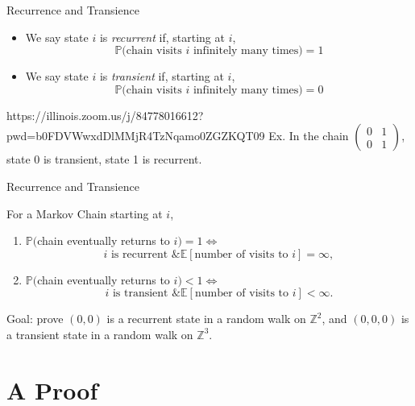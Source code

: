 \documentclass[aspectratio=169, handout]{beamer}
\newcommand{\pp}[0]{\mathbb{P}}
\newcommand{\ee}[0]{\mathbb{E}}
\begin{document}
\begin{frame}{Recurrence and Transience}
    \begin{itemize}
        \item We say state $i$ is \textit{recurrent} if, starting at $i$,
        \[\pp(\text{chain visits $i$ infinitely many times)} = 1\]
        \item We say state $i$ is \textit{transient} if, starting at $i$, 
        \[\pp(\text{chain visits $i$ infinitely many times)} = 0\]
    \end{itemize} \pause
    
https://illinois.zoom.us/j/84778016612?pwd=b0FDVWwxdDlMMjR4TzNqamo0ZGZKQT09    Ex. In the chain $\begin{pmatrix}
        0 & 1 \\
        0 & 1 
    \end{pmatrix}$, state 0 is transient, state 1 is recurrent.
\end{frame}

\begin{frame}{Recurrence and Transience}
    \begin{thrm}
        For a Markov Chain starting at $i$,\\
        \begin{enumerate}
            \item $\pp($chain eventually returns to $i) = 1 \Leftrightarrow$
        \[i \text{ is recurrent \& } \ee[ \text{number of visits to } i] = \infty,\]\pause
            \item $\pp($chain eventually returns to $i) < 1 \Leftrightarrow$
        \[i \text{ is transient \& } \ee[ \text{number of visits to } i] < \infty.\]
        
        \end{enumerate}\pause
    Goal: prove $(0,0)$ is a recurrent state in a random walk on $\mathbb{Z}^2$, and $(0,0,0)$ is a transient state in a random walk on $\mathbb{Z}^3$.
        
    \end{thrm}
\end{frame}

\section{A Proof}
\frame{\sectionpage}
\end{document}
